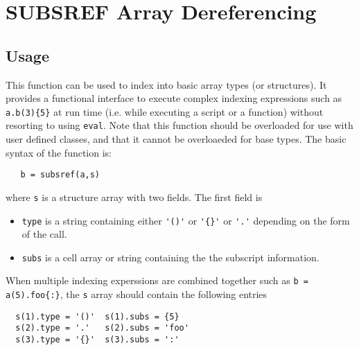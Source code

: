 \section{SUBSREF Array Dereferencing}

\subsection{Usage}

This function can be used to index into basic array
types (or structures).  It provides a functional interface
to execute complex indexing expressions such as 
\verb|a.b(3){5}| at run time (i.e. while executing a script or
a function) without resorting to using \verb|eval|.  Note that
this function should be overloaded for use with user defined
classes, and that it cannot be overloaeded for base types.
The basic syntax of the function is:
\begin{verbatim}
   b = subsref(a,s)
\end{verbatim}
where \verb|s| is a structure array with two fields. The
first field is
\begin{itemize}
\item  \verb|type|  is a string containing either \verb|'()'| or
 \verb|'{}'| or \verb|'.'| depending on the form of the call.

\item  \verb|subs| is a cell array or string containing the
 the subscript information.

\end{itemize}
When multiple indexing experssions are combined together
such as \verb|b = a(5).foo{:}|, the \verb|s| array should contain
the following entries
\begin{verbatim}
  s(1).type = '()'  s(1).subs = {5}
  s(2).type = '.'   s(2).subs = 'foo'
  s(3).type = '{}'  s(3).subs = ':'
\end{verbatim}
